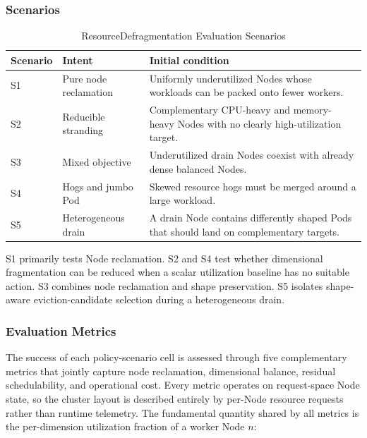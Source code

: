 \subsubsection{Scenarios}
\label{sec:defrag_scenarios}

\begin{table}[tbp]
    \centering
    \caption{ResourceDefragmentation Evaluation Scenarios}
    \label{tab:defrag_scenarios}
    \small
    \renewcommand{\arraystretch}{1.2}
    \begin{tabular}{l p{3.6cm} p{7.4cm}}
        \hline
        \textbf{Scenario} & \textbf{Intent} & \textbf{Initial condition} \\
        \hline
        S1 & Pure node reclamation & Uniformly underutilized Nodes whose workloads can be packed onto fewer workers. \\
        S2 & Reducible stranding & Complementary CPU-heavy and memory-heavy Nodes with no clearly high-utilization target. \\
        S3 & Mixed objective & Underutilized drain Nodes coexist with already dense balanced Nodes. \\
        S4 & Hogs and jumbo Pod & Skewed resource hogs must be merged around a large workload. \\
        S5 & Heterogeneous drain & A drain Node contains differently shaped Pods that should land on complementary targets. \\
        \hline
    \end{tabular}
\end{table}

S1 primarily tests Node reclamation. S2 and S4 test whether dimensional fragmentation can be reduced when a scalar utilization baseline has no suitable action. S3 combines node reclamation and shape preservation. S5 isolates shape-aware eviction-candidate selection during a heterogeneous drain.

\subsubsection{Evaluation Metrics}
\label{sec:defrag_metrics}

The success of each policy-scenario cell is assessed through five complementary metrics that jointly capture node reclamation, dimensional balance, residual schedulability, and operational cost. Every metric operates on request-space Node state, so the cluster layout is described entirely by per-Node resource requests rather than runtime telemetry. The fundamental quantity shared by all metrics is the per-dimension utilization fraction of a worker Node \(n\):

